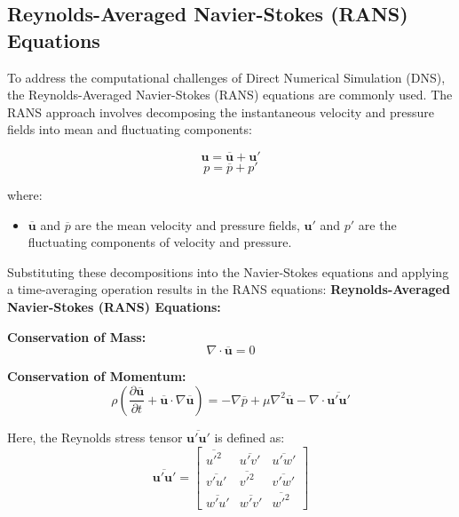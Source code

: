 \subsection{Reynolds-Averaged Navier-Stokes (RANS) Equations}
To address the computational challenges of Direct Numerical Simulation (DNS), the Reynolds-Averaged Navier-Stokes (RANS) equations are commonly used. The RANS approach involves decomposing the instantaneous velocity and pressure fields into mean and fluctuating components:

\begin{equation}
\mathbf{u} = \overline{\mathbf{u}} + \mathbf{u}'
\end{equation}
\begin{equation}
p = \overline{p} + p'
\end{equation}

where:
\begin{itemize}
    \item $\overline{\mathbf{u}}$ and $\overline{p}$ are the mean velocity and pressure fields, $\mathbf{u}'$ and $p'$ are the fluctuating components of velocity and pressure.
\end{itemize}

Substituting these decompositions into the Navier-Stokes equations and applying a time-averaging operation results in the RANS equations:
\textbf{Reynolds-Averaged Navier-Stokes (RANS) Equations:}

\textbf{Conservation of Mass:}
\begin{equation}
\nabla \cdot \overline{\mathbf{u}} = 0
\end{equation}

\textbf{Conservation of Momentum:}
\begin{equation}
\rho \left( \frac{\partial \overline{\mathbf{u}}}{\partial t} + \overline{\mathbf{u}} \cdot \nabla \overline{\mathbf{u}} \right) = -\nabla \overline{p} + \mu \nabla^2 \overline{\mathbf{u}} - \nabla \cdot \overline{\mathbf{u}' \mathbf{u}'}
\end{equation}

Here, the Reynolds stress tensor $\overline{\mathbf{u}' \mathbf{u}'}$ is defined as:
\begin{equation}
\overline{\mathbf{u}' \mathbf{u}'} = 
\begin{bmatrix}
\overline{u'^2} & \overline{u'v'} & \overline{u'w'} \\
\overline{v'u'} & \overline{v'^2} & \overline{v'w'} \\
\overline{w'u'} & \overline{w'v'} & \overline{w'^2}
\end{bmatrix}
\end{equation}

